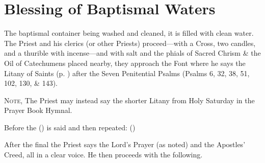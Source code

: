 \section{Blessing of Baptismal Waters}\label{BaptismalBlessing}
\fancyhead[RE,LO]{}
\begin{secrubric}
    The baptismal container being washed and cleaned, it is filled with clean water. The Priest and his clerics (or other Priests) proceed---with a Cross, two candles, and a thurible with incense---and with salt and the phials of Sacred Chrism \& the Oil of Catechumens placed nearby, they approach the Font where he says the Litany of Saints (p. \pageref{LitanySaints}) after the Seven Penitential Psalms (Psalms 6, 32, 38, 51, 102, 130, \& 143).\par
    \textsc{Note,} The Priest may instead say the shorter Litany from Holy Saturday in the Prayer Book Hymnal.
\end{secrubric}
\begin{secrubric}
    Before the  () is said and then repeated:  ()
\end{secrubric}
\begin{secrubric}
    After the final  the Priest says the Lord's Prayer (as noted) and the Apostles' Creed, all in a clear voice. He then proceeds with the following.
\end{secrubric}






\oremus

